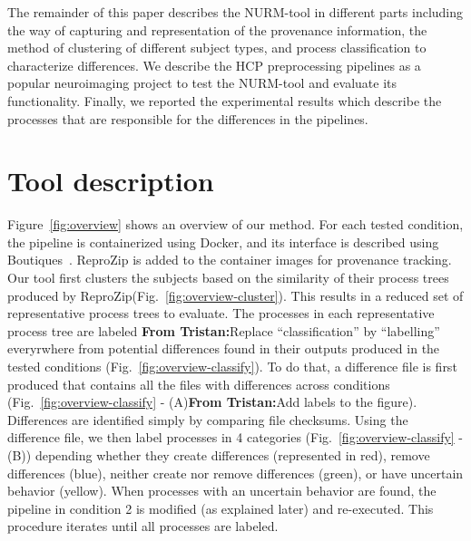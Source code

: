 \documentclass[a4paper,num-refs]{oup-contemporary}
\newcommand{\reprozip}[0]{ReproZip\xspace}
\newcommand{\tristan}[1]{\color{blue}\textbf{From Tristan:}#1\color{black}}
\begin{document}
The remainder of this paper describes the NURM-tool in different parts 
including the way of capturing and representation of the provenance 
information, the method of clustering of different subject types, and 
process classification to characterize differences. We describe the HCP 
preprocessing pipelines as a popular neuroimaging project to test the 
NURM-tool and evaluate its functionality. Finally, we reported the 
experimental results which describe the processes that are responsible 
for the differences in the pipelines.


\section{Tool description}

Figure~\ref{fig:overview} shows an overview of our method.
For each tested condition, the
pipeline is containerized using Docker, and its interface is
described using Boutiques~\cite{glatard2017boutiques}. \reprozip
is added to the container images for provenance tracking. Our tool first
clusters the subjects based on the similarity of their process trees
produced by \reprozip (Fig.~\ref{fig:overview-cluster}). This results in a
reduced set of representative process trees to evaluate. The processes in
each representative process tree are labeled \tristan{Replace
``classification'' by ``labelling'' everyrwhere} from potential differences
found in their outputs produced in the tested conditions (Fig.~\ref{fig:overview-classify}).
To do that, a difference file is first produced that contains all the
files with differences across conditions
(Fig.~\ref{fig:overview-classify} - (A)\tristan{Add labels to the figure}).
Differences are identified simply by comparing file checksums. Using the
difference file, we then label processes in 4 categories (Fig.~\ref{fig:overview-classify} - (B)) depending
whether they create differences (represented in red), remove differences
(blue), neither create nor remove differences (green), or have uncertain
behavior (yellow). When processes with an uncertain behavior are found, the
pipeline in condition 2 is modified (as explained later) and re-executed. This
procedure iterates until all processes are labeled. 
\end{document}
